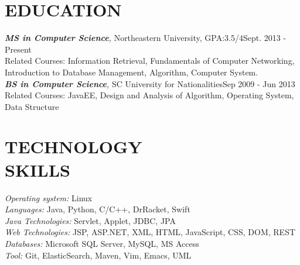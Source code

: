 \documentclass[margin, 10pt]{res}%
\begin{document}
\begin{resume}

\section{EDUCATION}

{\sl \textbf{MS in Computer Science},}
 Northeastern University,  GPA:3.5/4\hfill Sept. 2013 - Present \\
 Related Courses: Information Retrieval, Fundamentals of Computer Networking, Introduction to Database Management, Algorithm, Computer System.\\[0.1in]
{\sl \textbf{BS in Computer Science},}
 SC University for Nationalities\hfill Sep 2009 - Jun 2013 \\
 Related Courses: JavaEE, Design and Analysis of Algorithm, Operating System, Data Structure



\section{TECHNOLOGY \\ SKILLS}

{\sl Operating system:}  Linux\\
{\sl Languages:}  Java, Python, C/C++, DrRacket, Swift \\
{\sl Java Technologies:} Servlet, Applet, JDBC, JPA \\
{\sl Web Technologies:}  JSP, ASP.NET, XML, HTML, JavaScript, CSS, DOM, REST\\
{\sl Databases:}  Microsoft SQL Server, MySQL, MS Access\\
{\sl Tool:} Git, ElasticSearch, Maven, Vim, Emacs, UML\\

\end{resume}
\end{document}
